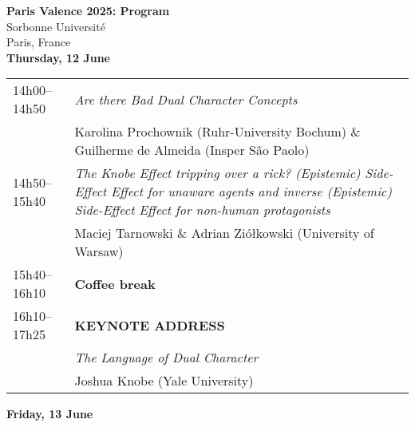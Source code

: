 \documentclass[a4paper,12pt]{article}
\begin{document}
\noindent \Huge \textbf{Paris Valence 2025: Program}\\
\large \noindent Sorbonne Université \\
\noindent Paris, France \\

\noindent \large\textbf{Thursday, 12 June}
\normalsize
\begin{center}
\begin{tabularx}{\textwidth}{>{\raggedright\arraybackslash}p{3cm} X}
\hline
14h00--14h50 & \textit{Are there Bad Dual Character Concepts} \\
           & Karolina Prochownik (Ruhr-University Bochum) \& Guilherme de Almeida (Insper São Paolo) \\
\hline
14h50--15h40 & \textit{The Knobe Effect tripping over a rick? (Epistemic) Side-Effect Effect for unaware agents and inverse (Epistemic) Side-Effect Effect for non-human protagonists} \\
             & Maciej Tarnowski \& Adrian Ziółkowski (University of Warsaw) \\
\hline
15h40--16h10 & \textbf{Coffee break} \\
\hline
16h10--17h25 & \textbf{KEYNOTE ADDRESS} \\
             & \textit{The Language of Dual Character} \\
             & Joshua Knobe (Yale University) \\
\hline
\end{tabularx}
\end{center}

\bigskip
\noindent \large \textbf{Friday, 13 June}
\normalsize
\end{document}
